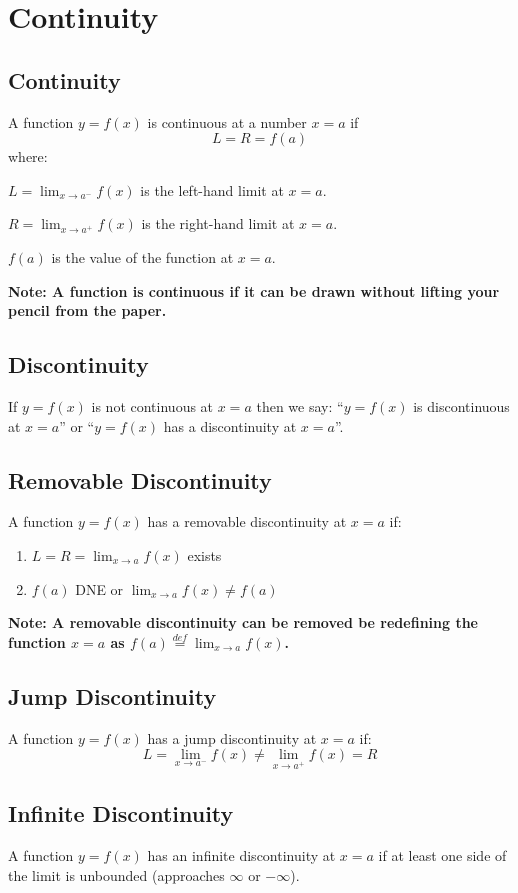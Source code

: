 \setcounter{section}{5}
\section{Continuity}
\subsection{Continuity}
	A function $y=f(x)$ is continuous at a number $x=a$ if \[L = R = f(a)\]
	where:

	$\displaystyle L = \lim_{x \to a^-} f(x)$ is the left-hand limit at $x=a$.

	$\displaystyle R = \lim_{x \to a^+} f(x)$ is the right-hand limit at $x=a$.

	$f(a)$ is the value of the function at $x=a$.
	
	\textbf{Note: A function is continuous if it can be drawn without lifting your pencil from the paper.}
\subsection{Discontinuity}
	If $y=f(x)$ is not continuous at $x=a$ then we say:
	``$y=f(x)$ is discontinuous at $x=a$''
	or
	``$y=f(x)$ has a discontinuity at $x=a$''.
\subsection{Removable Discontinuity}
	A function $y=f(x)$ has a removable discontinuity at $x=a$ if:
	\begin{enumerate}
		\item $\displaystyle L=R=\lim_{x \to a} f(x)$ exists
		\item $f(a)$ DNE or $\displaystyle \lim_{x \to a}f(x) \neq f(a)$
	\end{enumerate}
	\textbf{Note: A removable discontinuity can be removed be redefining the function $x=a$ as $\displaystyle f(a) \stackrel{def}{=} \lim_{x \to a} f(x)$.}
\subsection{Jump Discontinuity}
	A function $y=f(x)$ has a jump discontinuity at $x=a$ if:
	\[L = \lim_{x \to a^-} f(x) \neq \lim_{x \to a^+} f(x) = R\]
\subsection{Infinite Discontinuity}
	A function $y=f(x)$ has an infinite discontinuity at $x=a$ if at least one side of the limit is unbounded (approaches $\infty$ or $-\infty$).
